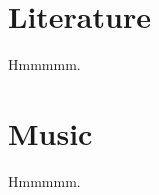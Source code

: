 \documentclass{article}
\begin{document}
\section{Literature}
Hmmmmm.

\section{Music}
Hmmmmm.
\end{document}
